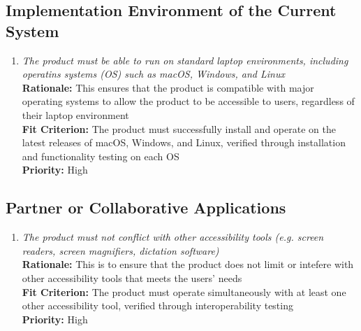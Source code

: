 \documentclass[12pt]{article}
\begin{document}
\subsection{Implementation Environment of the Current System}
\begin{enumerate}[label=MD-IE \arabic*., wide=0pt, leftmargin=*]
  \item \emph{The product must be able to run on standard laptop environments, including operatins systems (OS) such as 
  macOS, Windows, and Linux}\\[2mm]
    {\bf Rationale:} This ensures that the product is compatible with major operating systems to allow the product to be 
    accessible to users, regardless of their laptop environment\\
    {\bf Fit Criterion:} The product must successfully install and operate on the latest releases of macOS, Windows, and Linux,
    verified through installation and functionality testing on each OS\\
    {\bf Priority:} High
\end{enumerate}
\subsection{Partner or Collaborative Applications}
\begin{enumerate}[label=MD-PA \arabic*., wide=0pt, leftmargin=*]
  \item \emph{The product must not conflict with other accessibility tools (e.g. screen readers, screen magnifiers, dictation software)}\\[2mm]
    {\bf Rationale:} This is to ensure that the product does not limit or intefere with other accessibility tools that 
    meets the users' needs \\
    {\bf Fit Criterion:} The product must operate simultaneously with at least one other accessibility tool,
    verified through interoperability testing \\
    {\bf Priority:} High
\end{enumerate}
\end{document}
